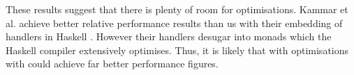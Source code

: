 These results suggest that there is plenty of room for optimisations. Kammar et al. achieve better relative performance results than us with their embedding of handlers in Haskell \cite{Kammar2013}. However their handlers desugar into monads which the Haskell compiler extensively optimises. Thus, it is likely that with optimisations with could achieve far better performance figures.